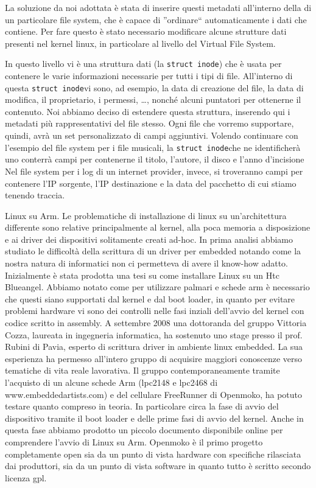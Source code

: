 \documentclass[a4paper,12pt]{article}
\newcommand{\ua }{\`{u} }
\renewcommand{\aa }{\`{a} }
\newcommand{\ea }{\`{e} }
\newcommand{\egrave }{\'{e} }
\newcommand{\strucinode}{\texttt{struct inode}}
\begin{document}
La soluzione da noi adottata \ea stata di inserire questi metadati all'interno della di un particolare file system, che è capace di ''ordinare`` automaticamente i dati che contiene.
Per fare questo \ea stato necessario modificare alcune strutture dati presenti nel kernel linux, in particolare al livello del Virtual File System.

In questo livello vi \ea una struttura dati (la \strucinode) che \ea usata per contenere le varie informazioni necessarie per tutti i tipi di file.
All'interno di questa \strucinode vi sono, ad esempio, la data di creazione del file, la data di modifica, il proprietario, i permessi, \dots, nonch\egrave alcuni puntatori per ottenerne il contenuto.
Noi abbiamo deciso di estendere questa struttura, inserendo qui i metadati pi\ua rappresentativi del file stesso.
Ogni file che vorremo supportare, quindi, avr\aa un set personalizzato di campi aggiuntivi.
Volendo continuare con l'esempio del file system per i file musicali, la \strucinode che ne identificher\aa uno conterr\aa campi per contenerne il titolo, l'autore, il disco e l'anno d'incisione
Nel file system per i log di un internet provider, invece, si troveranno campi per contenere l'IP sorgente, l'IP destinazione e la data del pacchetto di cui stiamo tenendo traccia.

Linux su Arm.
Le problematiche di installazione di linux su un'architettura differente sono relative principalmente al kernel, alla poca memoria a disposizione e ai driver dei dispositivi solitamente creati ad-hoc. In prima analisi abbiamo studiato le difficolt\aa della scrittura di un driver per embedded notando come la nostra natura di informatici non ci permetteva di avere il know-how adatto.
Inizialmente \ea stata prodotta una tesi su come installare Linux su un Htc Blueangel. Abbiamo notato come per utilizzare palmari e schede arm \ea necessario che questi siano supportati dal kernel e dal boot loader, in quanto per evitare problemi hardware vi sono dei controlli nelle fasi inziali dell'avvio del kernel con codice scritto in assembly.
A settembre 2008 una dottoranda del gruppo Vittoria Cozza, laureata in ingegneria informatica, ha sostenuto uno stage presso il prof. Rubini di Pavia, esperto di scrittura driver in ambiente linux embedded. La sua esperienza ha permesso all'intero gruppo di acquisire maggiori conoscenze verso tematiche di vita reale lavorativa. Il gruppo contemporaneamente tramite l'acquisto di un alcune schede Arm (lpc2148 e lpc2468 di  www.embeddedartists.com) e del cellulare FreeRunner di Openmoko, ha potuto testare quanto compreso in teoria. In particolare circa la fase di avvio del dispositivo tramite il boot loader e delle prime fasi di avvio del kernel. Anche in questa fase abbiamo prodotto un piccolo documento disponibile online per comprendere l'avvio di Linux su Arm.
Openmoko \ea il primo progetto completamente open sia da un punto di vista hardware con specifiche rilasciata dai produttori, sia da un punto di vista software in quanto tutto \ea scritto secondo licenza gpl.
\end{document}
